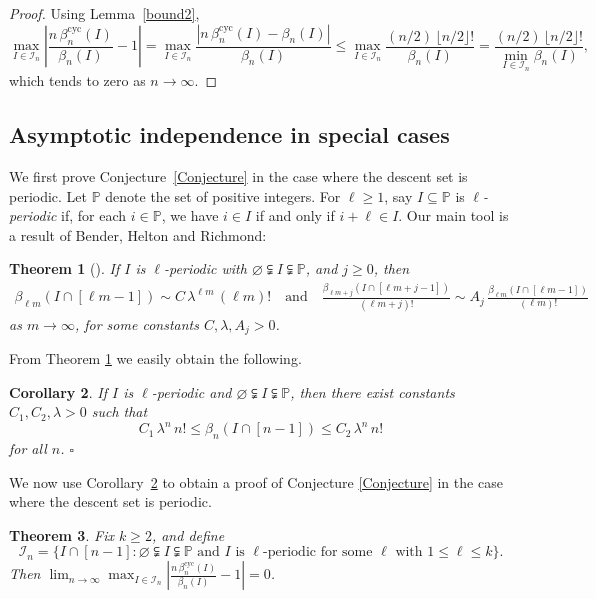 \documentclass[12pt]{article}
\newcommand{\betacyc}{\beta^{\text{cyc}}}
\newcommand{\PP}{\mathbb{P}}
\newtheorem{thm}{Theorem}[section]
\newtheorem{cor}[thm]{Corollary}
\theoremstyle{definition}
\begin{document}
\begin{proof} Using Lemma~\ref{bound2},
$$\max_{I \in \mathcal{I}_n} \left|\frac{n\,\betacyc_n(I)}{\beta_n(I)} - 1\right| = \max_{I \in \mathcal{I}_n} \frac{\left|n\,\betacyc_n(I) - \beta_n(I) \right|}{\beta_n(I)} 
\le \max_{I \in \mathcal{I}_n} \frac{(n/2)\,\lfloor n/2\rfloor!}{\beta_n(I)}= \frac{(n/2)\,\lfloor n/2\rfloor!}{\displaystyle\min_{I \in \mathcal{I}_n} \beta_n(I)},$$
which tends to zero as $n\to\infty$. 
\end{proof}

\subsection{Asymptotic independence in special cases} \label{sec:special}

We first prove Conjecture~\ref{Conjecture} in the case where the descent set is periodic. Let $\PP$ denote the set of positive integers. For $\ell \ge 1$, say $I \subseteq \PP$ is \emph{$\ell$-periodic} if, for each $i \in \PP$, we have $i \in I$ if and only if $i+\ell \in I$.
Our main tool is a result of Bender, Helton and Richmond:

\begin{thm}[{\cite[Thm.\ 1 \& 2]{BHR}}] \label{thm:BHR} If $I$ is $\ell$-periodic with $\varnothing \subsetneqq I \subsetneqq \PP$, and $j \ge 0$, then
\begin{align*} \beta_{\ell m}(I \cap [\ell m-1]) \sim C\,\lambda^{\ell m}\,(\ell m)! \quad\text{and}\quad
\frac{\beta_{\ell m+j}(I \cap [\ell m+j-1])}{(\ell m+j)!} \sim A_j\,\frac{\beta_{\ell m}(I \cap [\ell m-1])}{(\ell m)!}
\end{align*}
as $m \to \infty$, for some constants $C, \lambda, A_j > 0$.
\end{thm}

From Theorem \ref{thm:BHR} we easily obtain the following.
\begin{cor} \label{cor:periodic1} If $I$ is $\ell$-periodic and $\varnothing \subsetneqq I \subsetneqq \PP$, then there exist constants $C_1, C_2, \lambda > 0$ such that
\[ C_1\,\lambda^n\,n! \le \beta_n(I \cap [n-1]) \le C_2\,\lambda^n\,n! \]
for all $n$. \hfill $\square$
\end{cor}

We now use Corollary~\ref{cor:periodic1} to obtain a proof of Conjecture \ref{Conjecture} in the case where the descent set is periodic.

\begin{thm} \label{thm:periodic2} Fix $k \ge 2$, and define
\[ \mathcal{I}_n = \{ I \cap [n-1]  \colon \varnothing\subsetneqq I \subsetneqq \PP \text{ and $I$ is $\ell$-periodic for some $\ell$ with $1 \le \ell \le k$}\}. \]
Then $\lim_{n\to\infty} \max_{I \in \mathcal{I}_n} \left|\frac{n\,\betacyc_n(I)}{\beta_n(I)} - 1\right| = 0$.
\end{thm}
\end{document}
